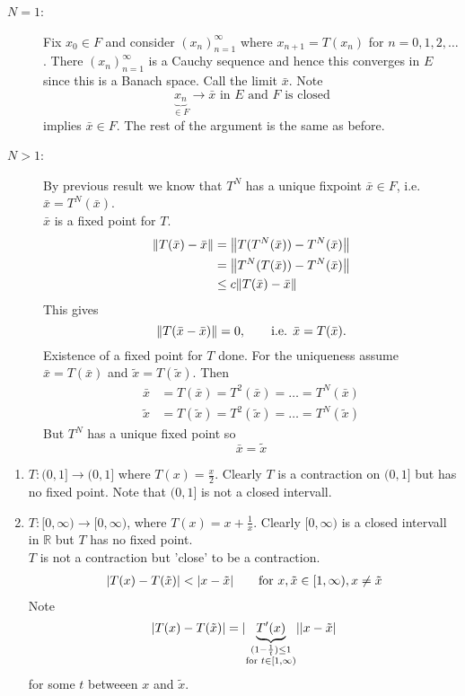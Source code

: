 \begin{beweis}
	\begin{description}
		\item[$N=1$:] Fix $x_0 \in F$ and consider $(x_n)_{n=1}^{\infty}$ where $x_{n+1} = T(x_n)$ for $n=0,1,2, \dots$. There $(x_n)_{n=1}^{\infty}$ is a Cauchy sequence and hence this converges in $E$ since this is a Banach space. Call the limit $\bar{x}$. Note
		\[
			\underset{\in F}{\underbrace{x_n}} \to \bar{x} \text{ in }E \text{ and $F$ is closed}
		\] 
		implies $\bar{x} \in F$. The rest of the argument is the same as before.
		\item[$N>1$:] By previous result we know that $T^N$ has a unique fixpoint $\bar{x} \in F$, i.e. $\bar{x} = T^N(\bar{x})$. \\
		$\bar{x}$ is a fixed point for $T$.
		\begin{align*}
			\norm{T(\bar{x})-\bar{x}} &= \norm{T(T^N(\bar{x}))- T^N(\bar{x})} \\
			&= \norm{T^N(T(\bar{x}))- T^N(\bar{x})} \\
			&\leq c \norm{T(\bar{x})-\bar{x}}
 		\end{align*}
		This gives 
		\[
			\norm{T(\bar{x}-\bar{x})} = 0, \qquad \text{i.e. }\bar{x} = T(\bar{x}).
		\]
		Existence of a fixed point for $T$ done. For the uniqueness assume $\bar{x} = T(\bar{x})$ and $\tilde x = T( \tilde x)$. Then
	\begin{align*}
		\bar{x} &= T( \bar{x}) = T^2(\bar{x}) = \dots = T^N(\bar{x}) \\
		\tilde x &= T(\tilde x) = T^2(\tilde x) = \dots = T^N(\tilde x)
	\end{align*}
	But $T^N$ has a unique fixed point so 
	\[
		\bar{x} = \tilde x
	\]
	\end{description}
\end{beweis}
\begin{bemerkung}
	\begin{enumerate}[(1)]
		\item $T: (0,1] \to (0,1]$ where $T(x) = \frac{x}{2}$. Clearly $T$ is a contraction on $(0,1]$ but has no fixed point. Note that $(0,1]$ is not a closed intervall. 
		\item $T: [0,\infty) \to [0,\infty)$, where $T(x) = x + \frac{1}{x}$. Clearly $[0,\infty)$ is a closed intervall in $\mathbb{R}$ but $T$ has no fixed point. \\
		$T$ is not a contraction but 'close' to be a contraction. \\
		\begin{align*}
			\lvert T(x)-T(\tilde x)\rvert < \lvert x- \tilde x\rvert \qquad \text{for }x, \tilde x \in [1, \infty), x \neq \tilde x
		\end{align*}
		Note \[
			\lvert T(x)- T( \tilde x)\rvert = \lvert\underset{\substack{(1- \frac{1}{t})\leq 1 \\ \text{for }t \in [1,\infty)}}{\underbrace{T'(x)}}\rvert\lvert x- \tilde x\rvert
		\] for some $t$ betweeen $x$ and $\tilde x$.
	\end{enumerate}
\end{bemerkung}
